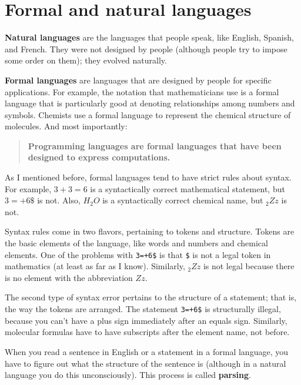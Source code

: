 \section{Formal and natural languages}
\label{formal}

{\bf Natural languages} are the languages that people speak,
like English, Spanish, and French.  They were not designed
by people (although people try to impose some order on them);
they evolved naturally.

{\bf Formal languages} are languages that are designed by people for
specific applications.  For example, the notation that mathematicians
use is a formal language that is particularly good at denoting
relationships among numbers and symbols.  Chemists use a formal
language to represent the chemical structure of molecules.  And
most importantly:

\begin{quote}
{\bf Programming languages are formal languages that have been
designed to express computations.}
\end{quote}

As I mentioned before, formal languages tend to have strict rules
about syntax.  For example, $3+3=6$ is a syntactically correct
mathematical statement, but $3=+6\$$ is not.  Also, $H_2O$ is a
syntactically correct chemical name, but $_2Zz$ is not.

Syntax rules come in two flavors, pertaining to tokens and structure.
Tokens are the basic elements of the language, like words and numbers
and chemical elements.  One of the problems with {\tt 3=+6\$} is that
{\tt \$} is not a legal token in mathematics (at least as far as I
know).  Similarly, $_2Zz$ is not legal because there is no element with
the abbreviation $Zz$.

The second type of syntax error pertains to the structure of a
statement; that is, the way the tokens are arranged.  The statement
{\tt 3=+6\$} is structurally illegal, because you can't have a plus
sign immediately after an equals sign.  Similarly, molecular formulas
have to have subscripts after the element name, not before.

When you read a sentence in English or a statement in a formal
language, you have to figure out what the structure of the sentence is
(although in a natural language you do this unconsciously).  This
process is called {\bf parsing}.


